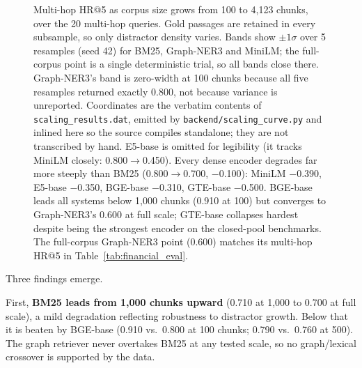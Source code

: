 \documentclass[runningheads]{llncs}
\begin{document}
\begin{figure}[t]
\caption{Multi-hop HR@5 as corpus size grows from 100 to 4{,}123 chunks, over the 20 multi-hop queries. Gold passages are retained in every subsample, so only distractor density varies. Bands show $\pm 1\sigma$ over 5 resamples (seed 42) for BM25, Graph-NER3 and MiniLM; the full-corpus point is a single deterministic trial, so all bands close there. Graph-NER3's band is zero-width at 100 chunks because all five resamples returned exactly 0.800, not because variance is unreported. Coordinates are the verbatim contents of \texttt{scaling\_results.dat}, emitted by \texttt{backend/scaling\_curve.py} and inlined here so the source compiles standalone; they are not transcribed by hand. E5-base is omitted for legibility (it tracks MiniLM closely: 0.800$\rightarrow$0.450). Every dense encoder degrades far more steeply than BM25 (0.800$\rightarrow$0.700, $-$0.100): MiniLM $-$0.390, E5-base $-$0.350, BGE-base $-$0.310, GTE-base $-$0.500. BGE-base leads all systems below 1{,}000 chunks (0.910 at 100) but converges to Graph-NER3's 0.600 at full scale; GTE-base collapses hardest despite being the strongest encoder on the closed-pool benchmarks. The full-corpus Graph-NER3 point (0.600) matches its multi-hop HR@5 in Table~\ref{tab:financial_eval}.}
\label{fig:scaling}
\end{figure}

Three findings emerge.

First, \textbf{BM25 leads from 1{,}000 chunks upward} (0.710 at 1{,}000 to 0.700 at full scale), a mild degradation reflecting robustness to distractor growth. Below that it is beaten by BGE-base (0.910 vs.\ 0.800 at 100 chunks; 0.790 vs.\ 0.760 at 500). The graph retriever never overtakes BM25 at any tested scale, so no graph/lexical crossover is supported by the data.
\end{document}
